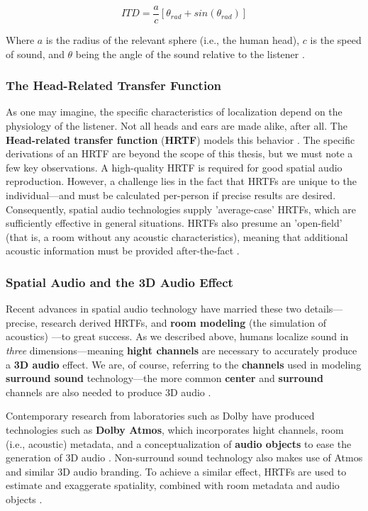 \documentclass{report}
\newcommand{\tech}[1]{\textbf{#1}}
\begin{document}
$$
ITD = \frac{a}{c}[\theta_{rad} + sin(\theta_{rad})]
$$

Where $a$ is the radius of the relevant sphere (i.e., the human head), $c$ is the speed of sound, and $\theta$ being the angle of the sound relative to the listener \cite{woodworth1954experimental}.

\subsubsection{The Head-Related Transfer Function}

As one may imagine, the specific characteristics of localization depend on the physiology of the listener. Not all heads and ears are made alike, after all. The \tech{Head-related transfer function} (\tech{HRTF}) models this behavior \cite{li2020measurement}. The specific derivations of an HRTF are beyond the scope of this thesis, but we must note a few key observations. A high-quality HRTF is required for good spatial audio reproduction. However, a challenge lies in the fact that HRTFs are unique to the individual---and must be calculated per-person if precise results are desired. Consequently, spatial audio technologies supply 'average-case' HRTFs, which are sufficiently effective in general situations. HRTFs also presume an 'open-field' (that is, a room without any acoustic characteristics), meaning that additional acoustic information must be provided after-the-fact \cite{moller1995head}. 

\subsubsection{Spatial Audio and the 3D Audio Effect}
Recent advances in spatial audio technology have married these two details---precise, research derived HRTFs, and \textbf{room modeling} (the simulation of acoustics) \cite{roommodel}---to great success. As we described above, humans localize sound in \emph{three} dimensions---meaning \tech{hight channels} are necessary to accurately produce a \tech{3D audio} effect. We are, of course, referring to the \tech{channels} used in modeling \tech{surround sound} technology---the more common \tech{center} and \tech{surround} channels are also needed to produce 3D audio \cite{3daudio}. 

Contemporary research from laboratories such as Dolby have produced technologies such as \tech{Dolby Atmos}, which incorporates hight channels, room (i.e., acoustic) metadata, and a conceptualization of \tech{audio objects} to ease the generation of 3D audio \cite{Pfanzagl-Cardone2023}. Non-surround sound technology also makes use of Atmos and similar 3D audio branding. To achieve a similar effect, HRTFs are used to estimate and exaggerate spatiality, combined with room metadata and audio objects \cite{dewey2024practitioners}.  
\end{document}
